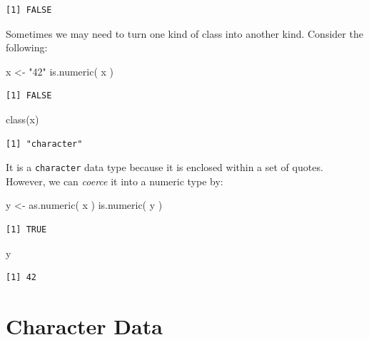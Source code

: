 \documentclass[
  letterpaper,
]{book}
\newenvironment{Shaded}{\begin{snugshade}}{\end{snugshade}}
\newcommand{\FunctionTok}[1]{\textcolor[rgb]{0.28,0.35,0.67}{#1}}
\newcommand{\NormalTok}[1]{\textcolor[rgb]{0.00,0.23,0.31}{#1}}
\newcommand{\OtherTok}[1]{\textcolor[rgb]{0.00,0.23,0.31}{#1}}
\newcommand{\StringTok}[1]{\textcolor[rgb]{0.13,0.47,0.30}{#1}}
\begin{document}
\begin{verbatim}
[1] FALSE
\end{verbatim}

Sometimes we may need to turn one kind of class into another kind.
Consider the following:

\begin{Shaded}
\begin{Highlighting}[]
\NormalTok{x }\OtherTok{\textless{}{-}} \StringTok{"42"}
\FunctionTok{is.numeric}\NormalTok{( x )}
\end{Highlighting}
\end{Shaded}

\begin{verbatim}
[1] FALSE
\end{verbatim}

\begin{Shaded}
\begin{Highlighting}[]
\FunctionTok{class}\NormalTok{(x)}
\end{Highlighting}
\end{Shaded}

\begin{verbatim}
[1] "character"
\end{verbatim}

It is a \texttt{character} data type because it is enclosed within a set
of quotes. However, we can \emph{coerce} it into a numeric type by:

\begin{Shaded}
\begin{Highlighting}[]
\NormalTok{y }\OtherTok{\textless{}{-}} \FunctionTok{as.numeric}\NormalTok{( x )}
\FunctionTok{is.numeric}\NormalTok{( y )}
\end{Highlighting}
\end{Shaded}

\begin{verbatim}
[1] TRUE
\end{verbatim}

\begin{Shaded}
\begin{Highlighting}[]
\NormalTok{y}
\end{Highlighting}
\end{Shaded}

\begin{verbatim}
[1] 42
\end{verbatim}

\section{Character Data}\label{character-data}
\end{document}
